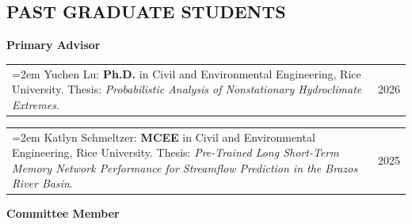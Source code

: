 \documentclass[10pt,oneside]{article}
\makeatletter
\newenvironment{alignedentrieshang}[1][2em]{%
  \noindent%
}{%
}
\newcommand{\hangingitem}[2]{%
  \noindent%
  \begin{tabular*}{\textwidth}{@{}p{0.85\textwidth}@{\extracolsep{\fill}}r@{}}%
    \hangindent=2em \hangafter=1 #1 & #2%
  \end{tabular*}%
}
\makeatother
\begin{document}
\subsection{PAST GRADUATE STUDENTS}

\noindent\textbf{Primary Advisor}

\begin{alignedentrieshang}

\hangingitem{Yuchen Lu: \textbf{Ph.D.} in Civil and Environmental Engineering, Rice University. Thesis: \textit{Probabilistic Analysis of Nonstationary Hydroclimate Extremes}.}{2026}

\hangingitem{Katlyn Schmeltzer: \textbf{MCEE} in Civil and Environmental Engineering, Rice University. Thesis: \textit{Pre-Trained Long Short-Term Memory Network Performance for Streamflow Prediction in the Brazos River Basin}.}{2025}

\end{alignedentrieshang}

\noindent\textbf{Committee Member}
\end{document}
